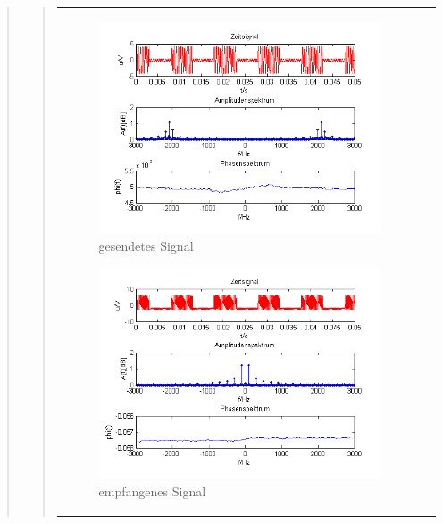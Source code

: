 \begin{quote}
\begin{quote}
\begin{center}
\begin{tabular}{ll}
\begin{minipage}{0.67\textwidth}
                \begin{figure}[H]
                    \label{fig:DemorechteckoT}
                    \includegraphics[scale=0.7]{Bilder/Am_Rec_2k_100Hz_mo}
                    \caption{gesendetes Signal}
                \end{figure}
        
            \end{minipage}
        
            \begin{minipage}{0.67\textwidth}
                \begin{figure}[H]
                    \label{fig:DemorechteckoT2}
                    \includegraphics[scale=0.7]{Bilder/Demo_Rec_2k_100Hz_mo_ohneTiefpass}
                    \caption{empfangenes Signal}
                \end{figure}
        

\end{minipage}
\end{tabular}
\end{center}
\end{quote}
\end{quote}
